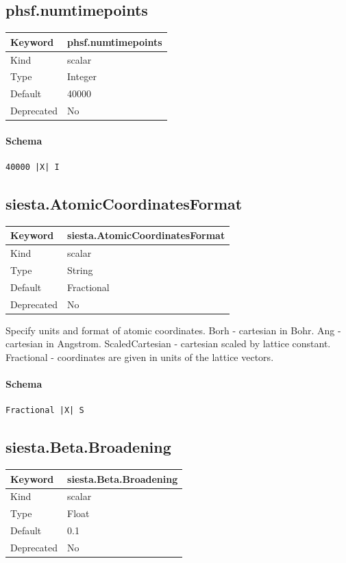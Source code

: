 \documentclass[11pt]{article}
\begin{document}
{{{{{\subsection{phsf.numtimepoints}
\label{kw:phsf-numtimepoints}
\begin{longtable}{|p{1.5in}|p{4.5in}|}
\hline
Keyword & phsf.numtimepoints \\
\hline
Kind & scalar \\
\hline
Type & Integer \\
\hline
Default & 40000 \\
\hline
Deprecated & No \\
\hline
\end{longtable}
\paragraph{Schema}
\begin{Verbatim}
40000 |X| I
\end{Verbatim}

\subsection{siesta.AtomicCoordinatesFormat}
\label{kw:siesta-AtomicCoordinatesFormat}
\begin{longtable}{|p{1.5in}|p{4.5in}|}
\hline
Keyword & siesta.AtomicCoordinatesFormat \\
\hline
Kind & scalar \\
\hline
Type & String \\
\hline
Default & Fractional \\
\hline
Deprecated & No \\
\hline
\end{longtable}
 Specify units and format of atomic coordinates.
 Borh            - cartesian in Bohr.
 Ang             - cartesian in Angstrom.
 ScaledCartesian - cartesian scaled by lattice constant.
 Fractional      - coordinates are given in units of the lattice vectors.

\paragraph{Schema}
\begin{Verbatim}
Fractional |X| S
\end{Verbatim}

\subsection{siesta.Beta.Broadening}
\label{kw:siesta-Beta-Broadening}
\begin{longtable}{|p{1.5in}|p{4.5in}|}
\hline
Keyword & siesta.Beta.Broadening \\
\hline
Kind & scalar \\
\hline
Type & Float \\
\hline
Default & 0.1 \\
\hline
Deprecated & No \\
\hline
\end{longtable}
}}}}}
\end{document}
